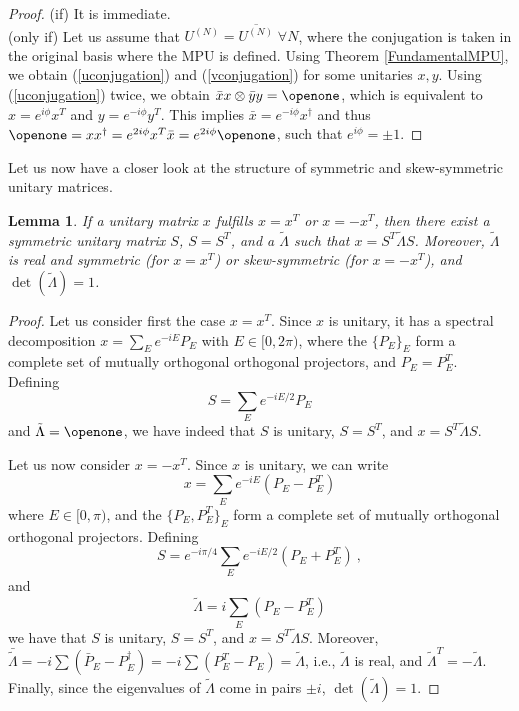 \documentclass[pra,twocolumn,nofootinbib,superscriptaddress]{revtex4-1}
\newtheorem{lem}[thm]{Lemma}
\begin{document}
\begin{proof}
	(if) It is immediate.\\[0.5ex]
	(only if) Let us assume that $U^{(N)}=\overline{U^{(N)}}\;\forall N$, where the
	conjugation is taken in the original basis where the MPU is defined. Using
	Theorem \ref{FundamentalMPU}, we obtain (\ref{uconjugation}) and
	(\ref{vconjugation}) for some unitaries $x,y$. Using (\ref{uconjugation})
	twice, we obtain $\bar x x \otimes \bar y y =\openone$, which is
	equivalent to $x=e^{i\phi} x^T$ and $y=e^{-i\phi} y^T$. This implies
	$\bar x = e^{-i\phi} x^\dagger$ and thus $\openone = xx^\dagger =
		e^{2i\phi} x^T\bar{x}=e^{2i\phi}\openone$, such that $e^{i\phi}=\pm1$.
\end{proof}

Let us now have a closer look at the structure of symmetric and
skew-symmetric unitary
matrices.

\begin{lem}
	\label{lemma:conjclass-normalform-continuous}
	If a unitary matrix $x$ fulfills $x=x^T$ or $x=-x^T$, then there exist a
	symmetric unitary matrix $S$, $S=S^T$, and a $\tilde\Lambda$
	such that $x=S^T\tilde\Lambda S$. Moreover,
	$\tilde\Lambda$ is real and symmetric (for $x=x^T$) or skew-symmetric (for
	$x=-x^T$), and $\det(\tilde\Lambda)=1$.
\end{lem}

\begin{proof}
	Let us consider first the case $x=x^T$. Since $x$ is unitary, it has a
	spectral decomposition $x= \sum_E e^{-i E} P_E$ with
	$E\in[0,2\pi)$, where the $\{P_E\}_E$ form a complete set of mutually
	orthogonal orthogonal projectors, and $P_E=P_E^T$.
	Defining
	\[
		S= \sum_E e^{-iE/2} P_E
	\]
	and $\tilde\Lambda=\openone$, we have indeed that $S$ is unitary,
	$S=S^T$, and $x=S^T\tilde\Lambda S$.

	Let us now consider $x=-x^T$. Since $x$ is unitary, we can write
	\[
		x= \sum_E e^{-iE} (P_E - P_E^T)
	\]
	where $E\in[0,\pi)$, and the $\{P_E,P_E^T\}_E$ form a complete set of
	mutually orthogonal orthogonal projectors. Defining
	\[
		S= e^{-i\pi/4}\sum_E e^{-iE/2} (P_E + P_E^T)\ ,
	\]
	and
	\[
		\tilde \Lambda = i \sum_E (P_E - P_E^T)
	\]
	we have that $S$ is unitary, $S=S^T$, and $x=S^T\tilde\Lambda S$.
	Moreover, $\bar{\tilde \Lambda}=-i\sum (\bar P_E-P_E^\dagger) =
		-i\sum(P_E^T-P_E)=\tilde\Lambda$, i.e., $\tilde\Lambda$ is real, and
	$\tilde\Lambda^T=-\tilde\Lambda$.  Finally, since the eigenvalues of
	$\tilde\Lambda$ come in pairs $\pm i$, $\det(\tilde\Lambda)=1$.
\end{proof}
\end{document}
